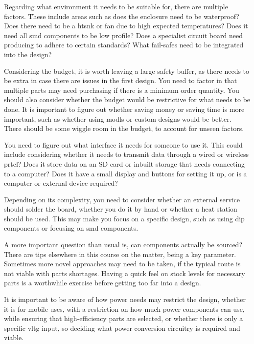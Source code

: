 \documentclass[a4paper,11pt]{report}
\begin{document}
Regarding what environment it needs to be suitable for, there are multiple factors. These include areas such as does the enclosure need to be waterproof? Does there need to be a \gls{htsnk} or fan due to high expected temperatures? Does it need all \gls{smd} components to be low profile? Does a specialist circuit board need producing to adhere to certain standards? What fail-safes need to be integrated into the design?

Considering the budget, it is worth leaving a large safety buffer, as there needs to be extra in case there are issues in the first design. You need to factor in that multiple parts may need purchasing if there is a minimum order quantity. You should also consider whether the budget would be restrictive for what needs to be done. It is important to figure out whether saving money or saving time is more important, such as whether using \gls{modl}s or custom designs would be better. There should be some wiggle room in the budget, to account for unseen factors.

You need to figure out what interface it needs for someone to use it. This could include considering whether it needs to transmit data through a wired or wireless \gls{prtcl}? Does it store data on an SD card or inbuilt storage that needs connecting to a computer? Does it have a small display and buttons for setting it up, or is a computer or external device required?

Depending on its complexity, you need to consider whether an external service should solder the board, whether you do it by hand or whether a heat station should be used. This may make you focus on a specific design, such as using \gls{dip} components or focusing on \gls{smd} components.

A more important question than usual is, can components actually be sourced? There are tips elsewhere in this course on the matter, being a key parameter. Sometimes more novel approaches may need to be taken, if the typical route is not viable with parts shortages. Having a quick feel on stock levels for necessary parts is a worthwhile exercise before getting too far into a design.

It is important to be aware of how power needs may restrict the design, whether it is for mobile uses, with a restriction on how much power components can use, while ensuring that high-efficiency parts are selected, or whether there is only a specific \gls{vltg} input, so deciding what power conversion circuitry is required and viable.
\end{document}
